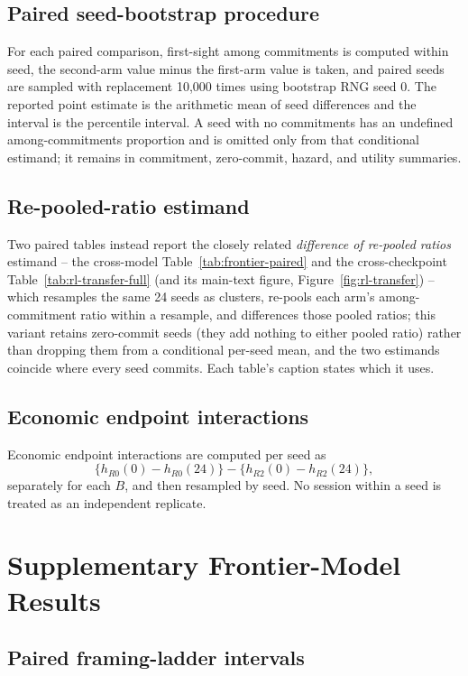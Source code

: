 \documentclass{article}
\begin{document}
\subsection{Paired seed-bootstrap procedure}

For each paired comparison, first-sight among commitments is computed within seed, the second-arm value minus the first-arm value is taken, and paired seeds are sampled with replacement 10,000 times using bootstrap RNG seed 0. The reported point estimate is the arithmetic mean of seed differences and the interval is the percentile interval. A seed with no commitments has an undefined among-commitments proportion and is omitted only from that conditional estimand; it remains in commitment, zero-commit, hazard, and utility summaries.

\subsection{Re-pooled-ratio estimand}

Two paired tables instead report the closely related \emph{difference of re-pooled ratios} estimand -- the cross-model Table~\ref{tab:frontier-paired} and the cross-checkpoint Table~\ref{tab:rl-transfer-full} (and its main-text figure, Figure~\ref{fig:rl-transfer}) -- which resamples the same 24 seeds as clusters, re-pools each arm's among-commitment ratio within a resample, and differences those pooled ratios; this variant retains zero-commit seeds (they add nothing to either pooled ratio) rather than dropping them from a conditional per-seed mean, and the two estimands coincide where every seed commits. Each table's caption states which it uses.

\subsection{Economic endpoint interactions}

Economic endpoint interactions are computed per seed as \[ \{h_{R0}(0)-h_{R0}(24)\} -\{h_{R2}(0)-h_{R2}(24)\}, \] separately for each $B$, and then resampled by seed. No session within a seed is treated as an independent replicate.

\section{Supplementary Frontier-Model Results} \label{app:supp-results}

\subsection{Paired framing-ladder intervals} \label{app:paired-intervals}
\end{document}
